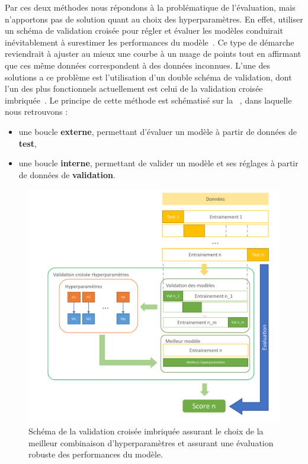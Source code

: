 Par ces deux méthodes nous répondons à la problématique de l'évaluation, mais n'apportons pas de solution quant au choix des hyperparamètres. En effet, utiliser un schéma de validation croisée pour régler et évaluer les modèles conduirait inévitablement à surestimer les performances du modèle~\cite{Tsamardinos2014}. Ce type de démarche reviendrait à ajuster au mieux une courbe à un nuage de points tout en affirmant que ces même données correspondent à des données inconnues. L'une des solutions a ce problème est l'utilisation d'un double schéma de validation, dont l'un des plus fonctionnels actuellement est celui de la validation croisée imbriquée~\cite{Cawley2010}. Le principe de cette méthode est schématisé sur la ~, dans laquelle nous retrouvons :
\begin{itemize}
    \item une boucle \textbf{externe}, permettant d'évaluer un modèle à partir de données de \textbf{test},
    \item une boucle \textbf{interne}, permettant de valider un modèle et ses réglages à partir de données de \textbf{validation}.
\end{itemize}\par
  
\begin{figure}[H]
    \centering
    \includegraphics[width=\linewidth]{contents/chapter_3/resources/scheme_hyperparameter_process.pdf}
    \caption{Schéma de la validation croisée imbriquée assurant le choix de la meilleur combinaison d'hyperparamètres et assurant une évaluation robuste des performances du modèle.}
    \label{fig:scheme_hyperparameter_process}
\end{figure}

